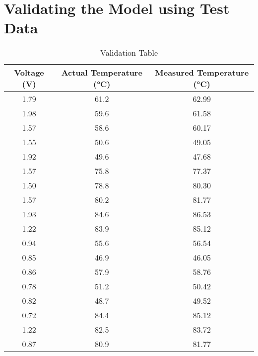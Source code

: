 \documentclass{article}
\begin{document}
\section*{Validating the Model using Test Data}

\begin{table}[h!]
\centering
\begin{tabular}{|c|c|c|}
\hline
\textbf{Voltage (V)} & \textbf{Actual Temperature (°C)} & \textbf{Measured Temperature (°C)} \\
\midrule
1.79 & 61.2 & 62.99 \\ \hline
1.98 & 59.6 & 61.58 \\  \hline
1.57 & 58.6 & 60.17 \\  \hline 
1.55 & 50.6 & 49.05 \\  \hline
1.92 & 49.6 & 47.68 \\  \hline
1.57 & 75.8 & 77.37 \\  \hline
1.50 & 78.8 & 80.30 \\  \hline
1.57 & 80.2 & 81.77 \\  \hline
1.93 & 84.6 & 86.53 \\  \hline
1.22 & 83.9 & 85.12 \\  \hline
0.94 & 55.6 & 56.54 \\  \hline
0.85 & 46.9 & 46.05 \\  \hline
0.86 & 57.9 & 58.76 \\  \hline
0.78 & 51.2 & 50.42 \\  \hline
0.82 & 48.7 & 49.52 \\  \hline
0.72 & 84.4 & 85.12 \\  \hline
1.22 & 82.5 & 83.72 \\  \hline
0.87 & 80.9 & 81.77 \\  \hline
\end{tabular}
\caption{Validation Table}
\label{tab:temp_voltage}
\end{table}
\end{document}
